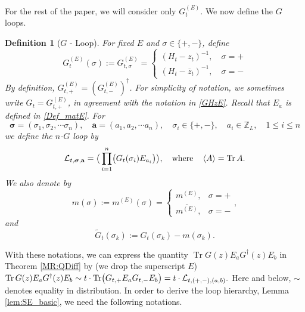 \documentclass[10pt,reqno]{article}
\renewcommand{\bar}{\overline}
\DeclareMathOperator{\tr}{Tr}
\theoremstyle{plain} %
\newtheorem{definition}[theorem]{Definition}
\theoremstyle{remark}
\numberwithin{equation}{section}
\begin{document}
For the rest of the paper, we will consider only  $G_t^{(E)}$.  We now define the $G$ loops. 
\begin{definition}[$G$ - Loop]\label{Def:G_loop}
 For fixed $E$ and $\sigma\in \{+,-\}$,  define
 \begin{equation}\nonumber
  G^{(E)}_{t }(\sigma):=  G^{(E)}_{t,\sigma} =
   \begin{cases}
       (H_t-z_t)^{-1}, \quad \sigma=+\\
        (H_t-\bar z_t)^{-1}, \quad \sigma=-
   \end{cases}
 \end{equation}
By definition, $G^{(E)}_{t,+} =\left(G^{(E)}_{t,-}\right)^\dagger$. 
For simplicity of notation, we sometimes write
$G_t=G^{(E)}_{t,+}$, in agreement with the notation in \eqref{GHzE}. Recall that $E_a$ is defined in \eqref{Def_matE}.
For 
$$
\boldsymbol{\sigma}=(\sigma_1, \sigma_2, \cdots \sigma_n),\quad 
\boldsymbol{a}=(a_1, a_2, \cdots a_n)
,\quad \sigma_i \in \{+,-\}, \quad
a_i\in \mathbb Z_L, \quad 1\le i\le n
$$
we define the $n$-$G$ loop by 
\begin{equation}\label{Eq:defGLoop}
    {\cal L}_{t, \boldsymbol{\sigma}, \textbf{a}}=\big \langle \prod_{i=1}^n \bigl(G_t(\sigma_i)E_{a_i}\bigr)\big \rangle,\quad 
\text{where} \quad \left\langle A\right\rangle=\tr A.
\end{equation}
We also denote by 
\begin{equation}\label{def_mtzk}
m (\sigma ):=m^{(E)}(\sigma ) = \begin{cases}
     m^{(E)}, & \sigma  =+ \\
     \overline{m^{(E)}} , & \sigma = -
\end{cases},
\end{equation}
and
\begin{equation}\label{Eq:defwtG}
 \widetilde{G}_t(\sigma_k) := G_t(\sigma_k) - m (\sigma_k) .
\end{equation}
\end{definition}

With these notations, we can express the quantity 
$\tr G (z) E_a G^\dagger(z)  E_b$ in Theorem \ref{MR:QDiff} by 
(we drop the  superscript $E$)
$
\tr G(z) E_a G^\dagger(z)  E_b\sim t \cdot \tr\bigl(G_{t,+}E_aG_{t,-}E_b\bigr)=t\cdot {\cal L}_{t, (+,-),(a,b)}.
$
Here and below, \(\sim\) denotes equality in distribution.
In order to derive the loop hierarchy, Lemma \ref{lem:SE_basic}, we need  the following notations. 
\end{document}
